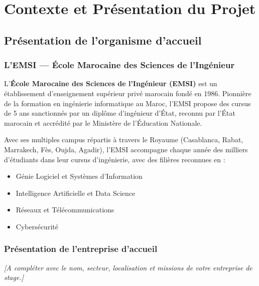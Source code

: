 \chapter{Contexte et Pr\'{e}sentation du Projet}

\section{Pr\'{e}sentation de l'organisme d'accueil}

\subsection{L'EMSI --- \'{E}cole Marocaine des Sciences de l'Ing\'{e}nieur}

L'\textbf{\'{E}cole Marocaine des Sciences de l'Ing\'{e}nieur (EMSI)} est un \'{e}tablissement
d'enseignement sup\'{e}rieur priv\'{e} marocain fond\'{e} en 1986. Pionni\`{e}re de la formation
en ing\'{e}nierie informatique au Maroc, l'EMSI propose des cursus de 5 ans sanctionn\'{e}s
par un dipl\^{o}me d'ing\'{e}nieur d'\'{E}tat, reconnu par l'\'{E}tat marocain et accr\'{e}dit\'{e} par
le Minist\`{e}re de l'\'{E}ducation Nationale.

Avec ses multiples campus r\'{e}partis \`{a} travers le Royaume (Casablanca, Rabat, Marrakech,
F\`{e}s, Oujda, Agadir), l'EMSI accompagne chaque ann\'{e}e des milliers d'\'{e}tudiants dans
leur cursus d'ing\'{e}nierie, avec des fili\`{e}res reconnues en :
\begin{itemize}[leftmargin=*, label=\textcolor{emsiRed}{\textbullet}]
  \item G\'{e}nie Logiciel et Syst\`{e}mes d'Information
  \item Intelligence Artificielle et Data Science
  \item R\'{e}seaux et T\'{e}l\'{e}communications
  \item Cybers\'{e}curit\'{e}
\end{itemize}

\subsection{Pr\'{e}sentation de l'entreprise d'accueil}

\textit{[A compl\'{e}ter avec le nom, secteur, localisation et missions de votre entreprise de stage.]}

